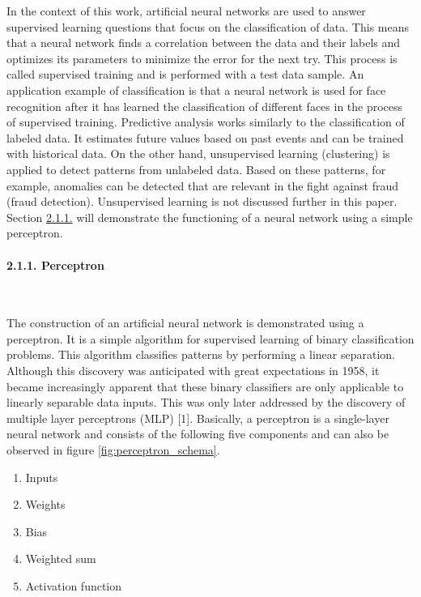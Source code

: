 \documentclass[
]{article}
\begin{document}
In the context of this work, artificial neural networks are used to
answer supervised learning questions that focus on the classification of
data. This means that a neural network finds a correlation between the
data and their labels and optimizes its parameters to minimize the error
for the next try. This process is called supervised training and is
performed with a test data sample. An application example of
classification is that a neural network is used for face recognition
after it has learned the classification of different faces in the
process of supervised training. Predictive analysis works similarly to
the classification of labeled data. It estimates future values based on
past events and can be trained with historical data. On the other hand,
unsupervised learning (clustering) is applied to detect patterns from
unlabeled data. Based on these patterns, for example, anomalies can be
detected that are relevant in the fight against fraud (fraud detection).
Unsupervised learning is not discussed further in this paper. Section
\protect\hyperlink{perceptron}{2.1.1.} will demonstrate the functioning
of a neural network using a simple perceptron.

\hypertarget{perceptron}{%
\paragraph{2.1.1. Perceptron}\label{perceptron}}

~

The construction of an artificial neural network is demonstrated using a
perceptron. It is a simple algorithm for supervised learning of binary
classification problems. This algorithm classifies patterns by
performing a linear separation. Although this discovery was anticipated
with great expectations in 1958, it became increasingly apparent that
these binary classifiers are only applicable to linearly separable data
inputs. This was only later addressed by the discovery of multiple layer
perceptrons (MLP) {[}1{]}. Basically, a perceptron is a single-layer
neural network and consists of the following five components and can
also be observed in figure \ref{fig:perceptron_schema}.

\begin{enumerate}
\def\labelenumi{\arabic{enumi}.}
\item
  Inputs
\item
  Weights
\item
  Bias
\item
  Weighted sum
\item
  Activation function
\end{enumerate}
\end{document}
